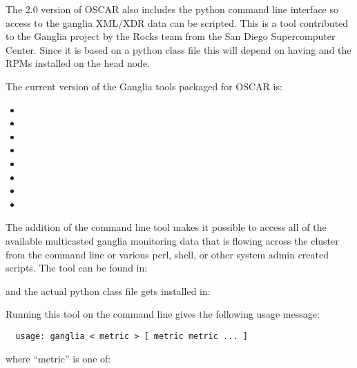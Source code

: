 The 2.0 version of OSCAR also includes the  python
command line interface so access to the ganglia XML/XDR data can be
scripted. This is a tool contributed to the Ganglia project by the
Rocks team from the San Diego Supercomputer Center. Since it is based
on a python class file this will depend on having 
and the  RPMs installed on the head node.

The current version of the Ganglia tools packaged for OSCAR is:

\begin{itemize}
\item {}
\item {}
\item {}
\item {}
\item {}
\item {}
\item {}
\item {}
\end{itemize}

The addition of the  command line tool makes it possible
to access all of the available multicasted ganglia monitoring data
that is flowing across the cluster from the command line or various
perl, shell, or other system admin created scripts.  The tool can be
found in:

\vspace{10pt}
\centerline{}
\vspace{10pt}

\noindent and the actual python class file gets installed in:

\vspace{10pt}
\centerline{}
\vspace{10pt}

Running this tool on the command line gives the following usage
message:

\begin{verbatim}
  usage: ganglia < metric > [ metric metric ... ]
\end{verbatim}

where ``metric'' is one of:

